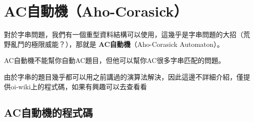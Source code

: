 \section{AC自動機（Aho-Corasick）}
對於字串問題，我們有一個重型資料結構可以使用，這幾乎是字串問題的大招（荒野亂鬥的極限威能？），那就是 \textbf{AC自動機}（Aho-Corasick Automaton）。

AC自動機不能幫你自動AC題目，但他可以幫你AC很多字串匹配的問題。

由於字串的題目幾乎都可以用之前講過的演算法解決，因此這邊不詳細介紹，僅提供oi-wiki上的程式碼，如果有興趣可以去查看看

\subsection{AC自動機的程式碼}

